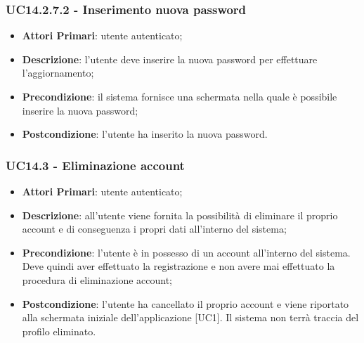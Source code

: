 \subsubsection{UC14.2.7.2 - Inserimento nuova password}
\begin{itemize}
	\item \textbf{Attori Primari}: utente autenticato;
	\item \textbf{Descrizione}: l'utente deve inserire la nuova password per effettuare l'aggiornamento;
	\item \textbf{Precondizione}: il sistema fornisce una schermata nella quale è possibile inserire la nuova password;
	\item \textbf{Postcondizione}: l'utente ha inserito la nuova password.
\end{itemize}


\subsubsection{UC14.3 - Eliminazione account}
\begin{itemize}
	\item \textbf{Attori Primari}: utente autenticato;
	\item \textbf{Descrizione}: all'utente viene fornita la possibilità di eliminare il proprio account e di conseguenza i propri dati all'interno del sistema;
	\item \textbf{Precondizione}: l'utente è in possesso di un account all'interno del sistema. Deve quindi aver effettuato la registrazione e non avere mai effettuato la procedura di eliminazione account;
	\item \textbf{Postcondizione}: l'utente ha cancellato il proprio account e viene riportato alla schermata iniziale dell'applicazione [UC1]. Il sistema non terrà traccia del profilo eliminato.
\end{itemize}

